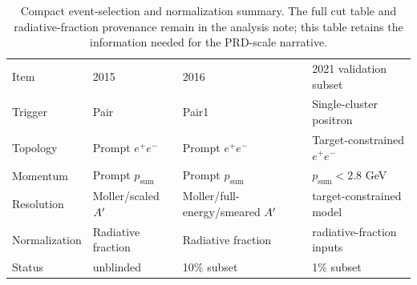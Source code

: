 \begin{table}[t]
\caption{\label{tab:selection-normalization}Compact event-selection and normalization
summary. The full cut table and radiative-fraction provenance remain in the analysis
note; this table retains the information needed for the PRD-scale narrative.}
\begin{ruledtabular}
\begin{tabular}{llll}
Item & 2015 & 2016 & 2021 validation subset \\
Trigger & Pair & Pair1 & Single-cluster positron \\
Topology & Prompt $e^+e^-$ & Prompt $e^+e^-$ & Target-constrained $e^+e^-$ \\
Momentum & Prompt $p_{\mathrm{sum}}$ & Prompt $p_{\mathrm{sum}}$ & $p_{\mathrm{sum}}<2.8$ GeV \\
Resolution & Moller/scaled $A^{\prime}$ & Moller/full-energy/smeared $A^{\prime}$ & target-constrained model \\
Normalization & Radiative fraction & Radiative fraction & radiative-fraction inputs \\
Status & unblinded & 10\% subset & 1\% subset \\
\end{tabular}
\end{ruledtabular}
\end{table}
